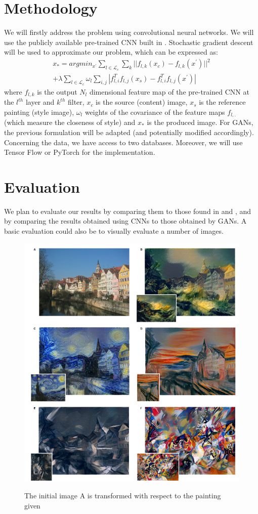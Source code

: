 \documentclass[final]{cvpr}
\begin{document}
	\section*{Methodology} 
	We will firstly address the problem using convolutional neural networks. We will use the publicly available pre-trained CNN built in \cite{2}. Stochastic gradient descent will be used to approximate our problem, which can be expressed \cite{6} as:   
	\begin{multline*}
	x_{*} = argmin_{x^\prime} \sum_{l \in \mathcal{L}_{c}} {\sum_{k} {||f_{l, k}(x_{c}) - f_{l,k}(x^\prime)||^2 }}  \\
	+ \lambda \sum_{l \in \mathcal{L}_{c}} {\omega_{l} \sum_{i, j} {|f_{l,i}^T f_{l,j}(x_{s}) - f_{l,i}^T f_{l,j}(x^\prime)|}} 
	\end{multline*}
	where $f_{l,k}$ is the output $N_{l}$ dimensional feature map of the pre-trained CNN at the $l^{th}$ layer and $k^{th}$ filter, $x_{c}$ is the source (content) image, $x_{s}$ is the reference painting (style image), $\omega_{l}$ weights of the covariance of the feature maps $f_{l,.}$ (which measure the closeness of style) and $x_{*}$ is the produced image. For GANs, the previous formulation will be adapted (and potentially modified accordingly). 
	Concerning the data, we have access to two databases. Moreover, we will use Tensor Flow or PyTorch for the implementation.  	
	
	\section*{Evaluation}
	We plan to evaluate our results by comparing them to those found in \cite{1} and \cite{4}, and by comparing the results obtained using CNNs to those obtained by GANs. A basic evaluation could also be to visually evaluate a number of images. 
	
	\begin{figure}
		\includegraphics[width=.5\textwidth]{example.png}
		\label{example}
		\caption{The initial image A is transformed with respect to the painting given}
	\end{figure} 

	{\small
		
		
	}
        
\end{document}
